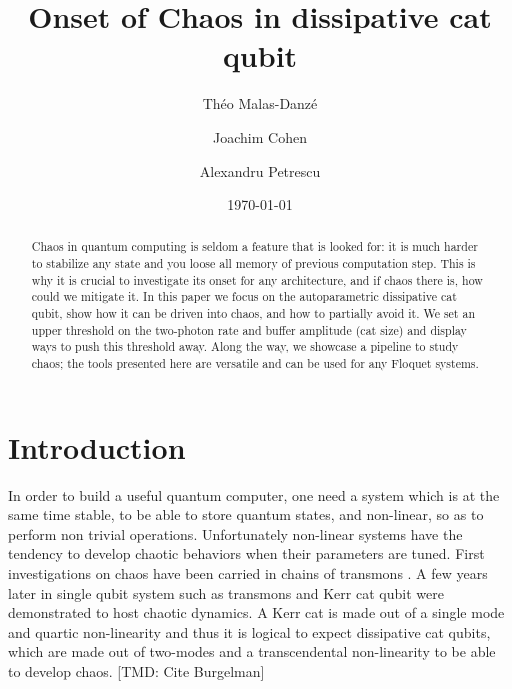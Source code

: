 \documentclass[aps,prx,reprint,floatfix,amsmath,amssymb,longbibliography]{revtex4-2}
\newcommand{\TMD}[1]{{\color{Blue} [TMD: {#1}]}}
\begin{document}
\title{Onset of Chaos in dissipative cat qubit}

\author{Théo Malas-Danzé}

\author{Joachim Cohen}

\author{Alexandru Petrescu}

\date{\today}

\begin{abstract}
Chaos in quantum computing is seldom a feature that is looked for: it is much harder to stabilize any state and you loose all memory of previous computation step. This is why it is crucial to investigate its onset for any architecture, and if chaos there is, how could we mitigate it. In this paper we focus on the autoparametric dissipative cat qubit, show how it can be driven into chaos, and how to partially avoid it. We set an upper threshold on the two-photon rate and buffer amplitude (cat size) and display ways to push this threshold away. Along the way, we showcase a pipeline to study chaos; the tools presented here are versatile and can be used for any Floquet systems.
\end{abstract}

\maketitle

\section{Introduction}
In order to build a useful quantum computer, one need a system which is at the same time stable, to be able to store quantum states, and non-linear, so as to perform non trivial operations. Unfortunately non-linear systems have the tendency to develop chaotic behaviors when their parameters are tuned. First investigations on chaos have been carried in chains of transmons \cite{Berke2022May}. A few years later in single qubit system such as transmons \cite{Cohen2023Apr} and Kerr cat qubit \cite{ChavezCarlos2024Nov} were demonstrated to host chaotic dynamics. A Kerr cat is made out of a single mode and quartic non-linearity and thus it is logical to expect dissipative cat qubits, which are made out of two-modes and a transcendental non-linearity to be able to develop chaos. \TMD{Cite Burgelman}
\end{document}
